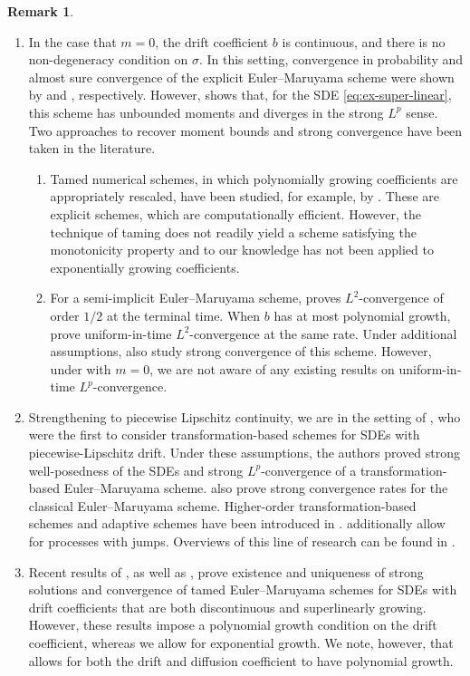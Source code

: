 \documentclass[onseside, final]{amsart}
\theoremstyle{definition}
\newtheorem{remark}[theorem]{Remark}
\numberwithin{equation}{section}
\begin{document}
	\begin{remark}\label{rem:growth-disc}~
		\begin{enumerate}[label = (\roman*)]
			\item In the case that $m = 0$, the drift coefficient $b$ is continuous, and there is no non-degeneracy condition on $\sigma$. In this setting, convergence in probability and almost sure convergence of the explicit Euler--Maruyama scheme were shown by \citet{GyKr96} and \citet{Gy98}, respectively. However, \citet[Theorem 1]{HuJeKl11} shows that, for the SDE \eqref{eq:ex-super-linear}, this scheme has unbounded moments and diverges in the strong $L^p$ sense. Two approaches to recover moment bounds and strong convergence have been taken in the literature.
			\begin{enumerate}
				\item Tamed numerical schemes, in which polynomially growing coefficients are appropriately rescaled, have been studied, for example, by \citet{HuJeKl12, Sa13}. These are explicit schemes, which are computationally efficient. However, the technique of taming does not readily yield a scheme satisfying the monotonicity property  and to our knowledge has not been applied to exponentially growing coefficients.
				\item For a semi-implicit Euler--Maruyama scheme, \citet{Hu96} proves $L^2$-convergence of order $1/2$ at the terminal time. When $b$ has at most polynomial growth, \citet{HiMaSt02} prove uniform-in-time $L^2$-convergence at the same rate. Under additional assumptions, \citet{MaSz13a,MaSz13b,HuJe15} also study strong convergence of this scheme. However, under  with $m = 0$, we are not aware of any existing results on uniform-in-time $L^p$-convergence.
			\end{enumerate}
			\item Strengthening  to piecewise Lipschitz continuity, we are in the setting of \citet{LeSz16,LeSz17}, who were the first to consider transformation-based schemes for SDEs with piecewise-Lipschitz drift. Under these assumptions, the authors proved strong well-posedness of the SDEs and strong $L^p$-convergence of a transformation-based Euler--Maruyama scheme. \citet{LeSz18,MuYa20} also prove strong convergence rates for the classical Euler--Maruyama scheme. Higher-order transformation-based schemes and adaptive schemes have been introduced in \citet{MuYa22,PrScSz22,Ya21,NeSzSz19}. \citet{PrSz21,PrSzXu21} additionally allow for processes with jumps. Overviews of this line of research can be found in \citet{LeSz17b,Sz21}.
			\item Recent results of \citet{MuSaYa22, SpSz23}, as well as \citet{HuGa22}, prove existence and uniqueness of strong solutions and convergence of tamed Euler--Maruyama schemes for SDEs with drift coefficients that are both discontinuous and superlinearly growing. However, these results impose a polynomial growth condition on the drift coefficient, whereas we allow for exponential growth. We note, however, that \cite{MuSaYa22} allows for both the drift and diffusion coefficient to have polynomial growth.
		\end{enumerate}
	\end{remark}
	
\end{document}
